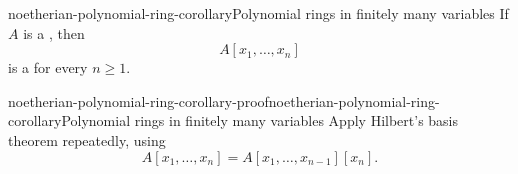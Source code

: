 \documentclass[preview]{standalone}
\begin{document}
\begin{snippetcorollary}{noetherian-polynomial-ring-corollary}{Polynomial rings in finitely many variables}
    If \(A\) is a \noetherianring, then
    \[
        A[x_1,\ldots,x_n]
    \]
    is a \noetherianring for every \(n\geq1\).
\end{snippetcorollary}

\begin{snippetproof}{noetherian-polynomial-ring-corollary-proof}{noetherian-polynomial-ring-corollary}{Polynomial rings in finitely many variables}
    Apply Hilbert's basis theorem repeatedly, using
    \[
        A[x_1,\ldots,x_n]
        =
        A[x_1,\ldots,x_{n-1}][x_n].
    \]
\end{snippetproof}
\end{document}
